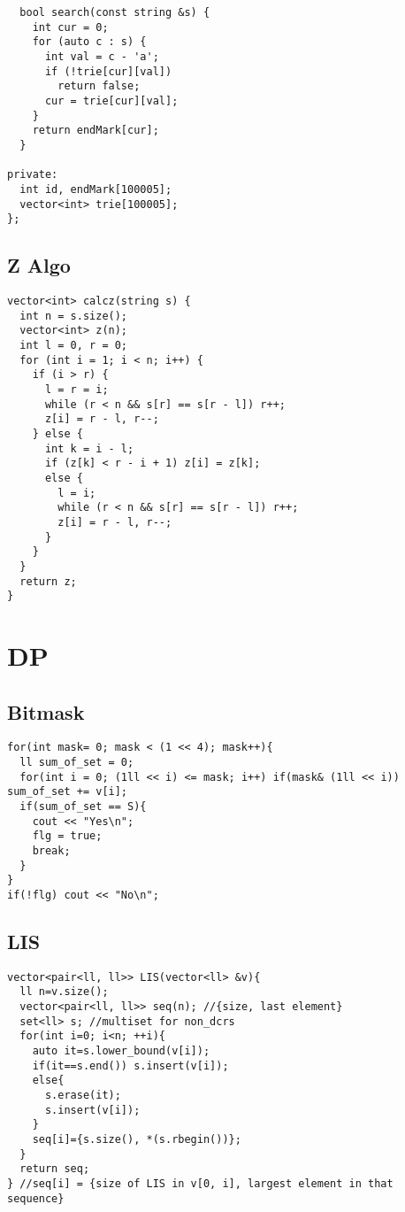 \documentclass[FSZ,a4paper,onesided]{article}
\begin{document}
\begin{multicols*}{\COLS}
\begin{lstlisting}
  bool search(const string &s) {
    int cur = 0;
    for (auto c : s) {
      int val = c - 'a';
      if (!trie[cur][val])
        return false;
      cur = trie[cur][val];
    }
    return endMark[cur];
  }

private:
  int id, endMark[100005];
  vector<int> trie[100005];
};
\end{lstlisting}
\subsection{Z Algo}
\begin{lstlisting}
vector<int> calcz(string s) {
  int n = s.size();
  vector<int> z(n);
  int l = 0, r = 0;
  for (int i = 1; i < n; i++) {
    if (i > r) {
      l = r = i;
      while (r < n && s[r] == s[r - l]) r++;
      z[i] = r - l, r--;
    } else {
      int k = i - l;
      if (z[k] < r - i + 1) z[i] = z[k];
      else {
        l = i;
        while (r < n && s[r] == s[r - l]) r++;
        z[i] = r - l, r--;
      }
    }
  }
  return z;
}
\end{lstlisting}
\section{DP}
\subsection{Bitmask}
\begin{lstlisting}
for(int mask= 0; mask < (1 << 4); mask++){
  ll sum_of_set = 0;
  for(int i = 0; (1ll << i) <= mask; i++) if(mask& (1ll << i)) sum_of_set += v[i];
  if(sum_of_set == S){
    cout << "Yes\n";
    flg = true;
    break;
  }
}
if(!flg) cout << "No\n";\end{lstlisting}
\subsection{LIS}
\begin{lstlisting}
vector<pair<ll, ll>> LIS(vector<ll> &v){
  ll n=v.size();
  vector<pair<ll, ll>> seq(n); //{size, last element}
  set<ll> s; //multiset for non_dcrs
  for(int i=0; i<n; ++i){
    auto it=s.lower_bound(v[i]);
    if(it==s.end()) s.insert(v[i]);
    else{
      s.erase(it);
      s.insert(v[i]);
    } 
    seq[i]={s.size(), *(s.rbegin())};
  }
  return seq;
} //seq[i] = {size of LIS in v[0, i], largest element in that sequence}\end{lstlisting}

\end{multicols*}
\end{document}
